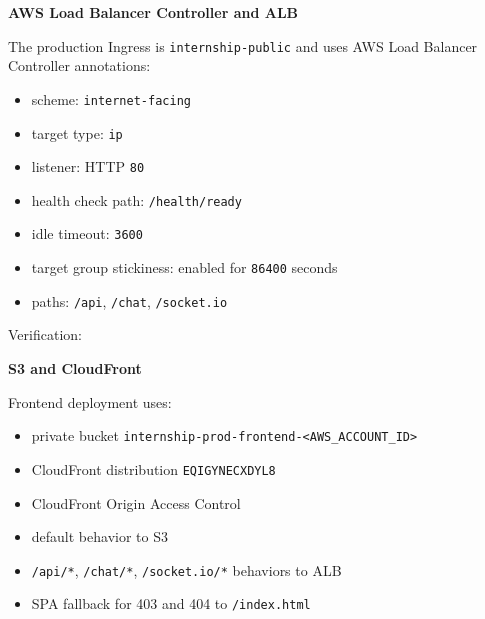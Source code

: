 \vspace{0.5em}\noindent\textbf{AWS Load Balancer Controller and
ALB}\par

The production Ingress is \texttt{internship-\allowbreak{}public} and uses AWS Load
Balancer Controller annotations:

\begin{itemize}
\tightlist
\item
  scheme: \texttt{internet-\allowbreak{}facing}
\item
  target type: \texttt{ip}
\item
  listener: HTTP \texttt{80}
\item
  health check path: \texttt{/\allowbreak{}health/\allowbreak{}ready}
\item
  idle timeout: \texttt{3600}
\item
  target group stickiness: enabled for \texttt{86400} seconds
\item
  paths: \texttt{/\allowbreak{}api}, \texttt{/\allowbreak{}chat}, \texttt{/\allowbreak{}socket.\allowbreak{}io}
\end{itemize}

Verification:

\begin{Shaded}
\begin{Highlighting}[]
\end{Highlighting}
\end{Shaded}

\vspace{0.5em}\noindent\textbf{S3 and CloudFront}\par

Frontend deployment uses:

\begin{itemize}
\tightlist
\item
  private bucket
  \texttt{internship-prod-frontend-\textless{}AWS\_ACCOUNT\_ID\textgreater{}}
\item
  CloudFront distribution \texttt{EQIGYNECXDYL8}
\item
  CloudFront Origin Access Control
\item
  default behavior to S3
\item
  \texttt{/\allowbreak{}api/\allowbreak{}*}, \texttt{/\allowbreak{}chat/\allowbreak{}*}, \texttt{/\allowbreak{}socket.\allowbreak{}io/\allowbreak{}*} behaviors to
  ALB
\item
  SPA fallback for 403 and 404 to \texttt{/\allowbreak{}index.\allowbreak{}html}
\end{itemize}

